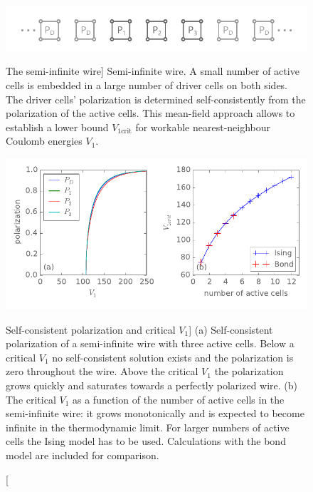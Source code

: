\begin{figure}
  \center
  \includegraphics{semi_infinite_wire}
  \caption
  [The semi-infinite wire]
  {
  Semi-infinite wire. A small number of active cells is embedded in a large
  number of driver cells on both sides. The driver cells' polarization is
  determined self-consistently from the polarization of the active cells. This
  mean-field approach allows to establish a lower bound $V_{1\textrm{crit}}$ for workable
  nearest-neighbour Coulomb energies $V_1$.
  }
  \label{fig:semi_infinite_wire}
  
  \vspace*{0.75cm}
  
  \includegraphics{critical_V1}
  \caption
  [Self-consistent polarization and critical $V_1$]
  {
  (a) Self-consistent polarization of a semi-infinite wire with three active cells.
  Below a critical $V_1$ no self-consistent solution exists and the polarization
  is zero throughout the wire. Above the critical $V_1$ the polarization grows
  quickly and saturates towards a perfectly polarized wire.
  (b) The critical $V_1$ as a function of the number of active cells in the
  semi-infinite wire: it grows monotonically and is expected to become infinite
  in the thermodynamic limit. For larger numbers of active cells the Ising model
  has to be used. Calculations with the bond model are included for comparison.
  }
  \label{fig:critical_V1}
\end{figure}


